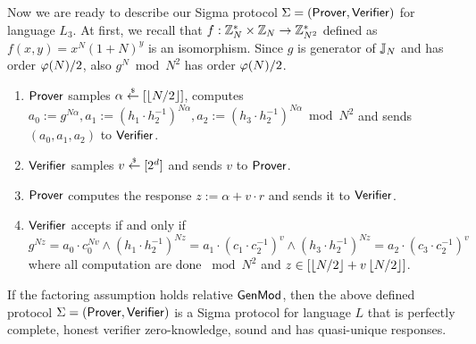 Now we are ready to describe our Sigma protocol $\Sigma = (\mathsf{Prover}, \mathsf{Verifier})$ for language $L_3$. At first, we recall that $f:\mathbb{Z}_N^* \times \mathbb{Z}_N \rightarrow \mathbb{Z}_{N^2}^*$ defined as $f(x,y)=x^N(1+N)^y$ is an isomorphism. Since $g$ is generator of $\mathbb{J}_N$ and has order $\varphi(N)/2$, also $g^N \bmod N^2$ has order $\varphi(N)/2$. 
\begin{enumerate}
\item $\mathsf{Prover}$ samples $\alpha \stackrel{{\scriptscriptstyle\$}}{\leftarrow} [\left\lfloor N/2 \right\rfloor]$, computes $a_0:=g^{N\alpha}, a_1:= (h_1\cdot h_2^{-1})^{N\alpha}, a_2:= (h_3\cdot h_2^{-1})^{N\alpha} \bmod N^2$ and sends $(a_0, a_1, a_2)$ to $\mathsf{Verifier}$.
\item $\mathsf{Verifier}$ samples $v \stackrel{{\scriptscriptstyle\$}}{\leftarrow} [2^d]$ and sends $v$ to $\mathsf{Prover}$.
\item $\mathsf{Prover}$ computes the response $z:= \alpha + v \cdot r$ and sends it to $\mathsf{Verifier}$.
\item $\mathsf{Verifier}$ accepts if and only if $g^{Nz} = a_0 \cdot c_0^{Nv} \land (h_1\cdot h_2^{-1})^{Nz} = a_1 \cdot (c_1\cdot c_2^{-1})^v  \land (h_3\cdot h_2^{-1})^{Nz} = a_2 \cdot (c_3\cdot c_2^{-1})^v$ where all computation are done $\bmod N^2$ and $z \in [\left\lfloor N/2 \right\rfloor + v\left\lfloor N/2 \right\rfloor]$.
\end{enumerate}

\begin{theorem}
\label{thm:SigmaROMFactoring}
If the factoring assumption holds relative $\mathsf{GenMod}$, then the above defined protocol $\Sigma = (\mathsf{Prover}, \mathsf{Verifier})$ is a Sigma protocol for language $L$ that is perfectly complete, honest verifier zero-knowledge, sound and has quasi-unique responses. 
\end{theorem}

